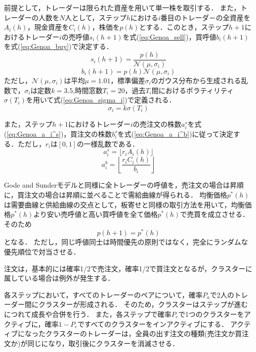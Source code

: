 \documentclass[titlepage]{jsreport}
\begin{document}
前提として，トレーダーは限られた資産を用いて単一株を取引する．
また，トレーダーの人数を$N$人として，ステップ$h$における$i$番目のトレーダ－の全資産を$A_i(h)$，現金資産を$C_i(h)$，株価を$p(h)$とする．このとき，ステップ$h + 1$におけるトレーダー$i$の売呼値$s_i(h + 1)$を式(\ref{eq:Genoa_sell})，買呼値$b_i(h + 1)$を式(\ref{eq:Genoa_buy})で決定する．
\begin{equation}
    s_i(h + 1) = \frac{p(h)}{\mathcal{N}(\mu, \sigma_i)} \label{eq:Genoa_sell}
\end{equation}
\begin{equation}
    b_i(h + 1) = p(h) \mathcal{N}(\mu, \sigma_i) \label{eq:Genoa_buy}
\end{equation}
ただし，$\mathcal{N}(\mu, \sigma_i)$は平均$\mu = 1.01$，標準偏差$\sigma_i$のガウス分布から生成される乱数で，$\sigma_i$は定数$k = 3.5$,時間窓数$T_i = 20$，過去$T_i$間におけるボラティリティ$\sigma(T_i)$を用いて式(\ref{eq:Genoa_sigma_i})で定義される．
\begin{equation}
    \sigma_i = k \sigma(T_i) \label{eq:Genoa_sigma_i}
\end{equation}

また，ステップ$h + 1$におけるトレーダー$i$の売注文の株数$a_i^s$を式(\ref{eq:Genoa_a_i^s})，買注文の株数$b_i^s$を式(\ref{eq:Genoa_a_i^b})に従って決定する．ただし，$r_i$は$[0, 1]$の一様乱数である．
\begin{equation}
    a_i^s = \lfloor r_i A_i(h) \rfloor \label{eq:Genoa_a_i^s}
\end{equation}
\begin{equation}
    a_i^b = \left\lfloor \frac{r_i C_i(h)}{b_i} \right\rfloor \label{eq:Genoa_a_i^b}
\end{equation}

Gode and Sunderモデルと同様に全トレーダーの呼値を，売注文の場合は昇順に，買注文の場合は昇順に並べることで需給曲線が得られる．
均衡価格$p^*(h)$は需要曲線と供給曲線の交点として，板寄せと同様の取引方法を用いて，均衡価格$p^*(h)$より安い売呼値と高い買呼値を全て価格$p^*(h)$で売買を成立させる．
そのため
\begin{equation}
    p(h + 1) = p^*(h) \label{eq:Genoa_price}
\end{equation}
となる．
ただし，同じ呼値同士は時間優先の原則ではなく，完全にランダムな優先順位で対当させる．

注文は，基本的には確率1/2で売注文，確率1/2で買注文となるが，クラスターに属している場合は例外が発生する．

各ステップにおいて，すべてのトレーダーのペアについて，確率$P_a$で2人のトレーダー間にクラスターが形成される．
そのため，クラスターはステップが進むにつれて成長や合併を行う．
また，各ステップで確率$P_c$で1つのクラスターをアクティブに，確率$1 - P_c$ですべてのクラスターをインアクティブにする．
アクティブになったクラスターのトレーダーは，全員の出す注文の種類(売注文か買注文か)が同じになり，取引後にクラスターを消滅させる．
\end{document}
